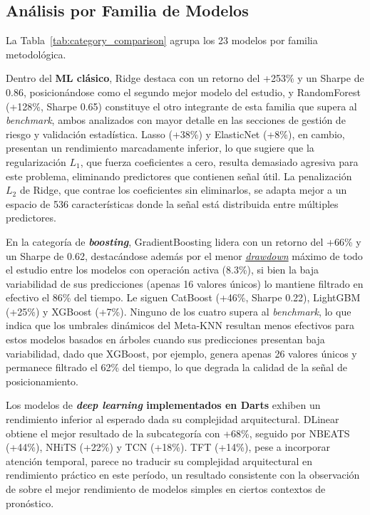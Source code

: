 

\subsection{An\'alisis por Familia de Modelos}
\label{subsec:family_analysis}

La Tabla~\ref{tab:category_comparison} agrupa los 23 modelos por familia metodol\'ogica.



Dentro del \textbf{ML cl\'asico}, Ridge destaca con un retorno del +253\% y un Sharpe de 0.86, posicion\'andose como el segundo mejor modelo del estudio, y RandomForest (+128\%, Sharpe 0.65) constituye el otro integrante de esta familia que supera al \textit{benchmark}, ambos analizados con mayor detalle en las secciones de gesti\'on de riesgo y validaci\'on estad\'istica. Lasso (+38\%) y ElasticNet (+8\%), en cambio, presentan un rendimiento marcadamente inferior, lo que sugiere que la regularizaci\'on $L_1$, que fuerza coeficientes a cero, resulta demasiado agresiva para este problema, eliminando predictores que contienen se\~nal \'util. La penalizaci\'on $L_2$ de Ridge, que contrae los coeficientes sin eliminarlos, se adapta mejor a un espacio de 536 caracter\'isticas donde la se\~nal est\'a distribuida entre m\'ultiples predictores.

En la categor\'ia de \textbf{\textit{boosting}}, GradientBoosting lidera con un retorno del +66\% y un Sharpe de 0.62, destac\'andose adem\'as por el menor \hyperlink{glos:drawdown}{\textit{drawdown}} m\'aximo de todo el estudio entre los modelos con operaci\'on activa (8.3\%), si bien la baja variabilidad de sus predicciones (apenas 16 valores \'unicos) lo mantiene filtrado en efectivo el 86\% del tiempo. Le siguen CatBoost (+46\%, Sharpe 0.22), LightGBM (+25\%) y XGBoost (+7\%). Ninguno de los cuatro supera al \textit{benchmark}, lo que indica que los umbrales din\'amicos del Meta-KNN resultan menos efectivos para estos modelos basados en \'arboles cuando sus predicciones presentan baja variabilidad, dado que XGBoost, por ejemplo, genera apenas 26 valores \'unicos y permanece filtrado el 62\% del tiempo, lo que degrada la calidad de la se\~nal de posicionamiento.

Los modelos de \textbf{\textit{deep learning} implementados en Darts} exhiben un rendimiento inferior al esperado dada su complejidad arquitectural. DLinear obtiene el mejor resultado de la subcategor\'ia con +68\%, seguido por NBEATS (+44\%), NHiTS (+22\%) y TCN (+18\%). TFT (+14\%), pese a incorporar atenci\'on temporal, parece no traducir su complejidad arquitectural en rendimiento pr\'actico en este per\'iodo, un resultado consistente con la observaci\'on de \citet{zeng2023} sobre el mejor rendimiento de modelos simples en ciertos contextos de pron\'ostico.

